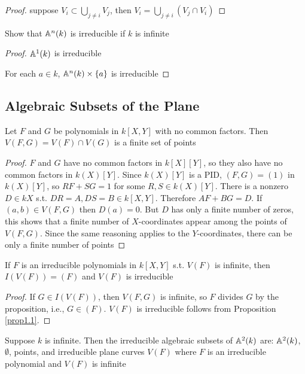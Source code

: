 \documentclass[11pt]{article}
\begin{document}
\begin{proof}
suppose \(V_i\subset\bigcup_{j\neq i}V_j\), then \(V_i=\bigcup_{j\neq i}(V_j\cap V_i)\)
\end{proof}

\begin{exercise}
\label{ex1.29}
Show that \(\mathbb{A}^n(k)\) is irreducible if \(k\) is infinite
\end{exercise}

\begin{proof}
\(\mathbb{A}^1(k)\) is irreducible

For each \(a\in k\), \(\mathbb{A}^n(k)\times\{a\}\) is irreducible
\end{proof}
\subsection{Algebraic Subsets of the Plane}
\label{sec:org339a2ee}
\begin{proposition}[]
\label{prop1.2}
Let \(F\) and \(G\) be polynomials in \(k[X,Y]\) with no common factors.
Then \(V(F,G)=V(F)\cap V(G)\) is a finite set of points
\end{proposition}

\begin{proof}
\(F\) and \(G\) have no common factors in \(k[X][Y]\), so they also have no common factors
in \(k(X)[Y]\). Since \(k(X)[Y]\) is a PID, \((F,G)=(1)\) in \(k(X)[Y]\), so \(RF+SG=1\) for
some \(R,S\in k(X)[Y]\). There is a nonzero \(D\in k{X}\) s.t. \(DR=A,DS=B\in k[X,Y]\).
Therefore \(AF+BG=D\). If \((a,b)\in V(F,G)\) then \(D(a)=0\). But \(D\) has only a finite number
of zeros, this shows that a finite number of \(X\)-coordinates appear among the points
of \(V(F,G)\). Since the same reasoning applies to the \(Y\)-coordinates, there can be only a
finite number of points
\end{proof}

\begin{corollary}[]
If \(F\) is an irreducible polynomials in \(k[X,Y]\) s.t. \(V(F)\) is infinite,
then \(I(V(F))=(F)\) and \(V(F)\) is irreducible
\end{corollary}

\begin{proof}
If \(G\in I(V(F))\), then \(V(F,G)\) is infinite, so \(F\) divides \(G\) by the proposition,
i.e., \(G\in(F)\). \(V(F)\) is irreducible follows from Proposition \ref{prop1.1}.
\end{proof}

\begin{corollary}[]
Suppose \(k\) is infinite. Then the irreducible algebraic subsets of \(\mathbb{A}^2(k)\)
are: \(\mathbb{A}^2(k)\), \(\emptyset\), points, and irreducible plane curves \(V(F)\) where \(F\) is an
irreducible polynomial and \(V(F)\) is infinite
\end{corollary}
\end{document}
